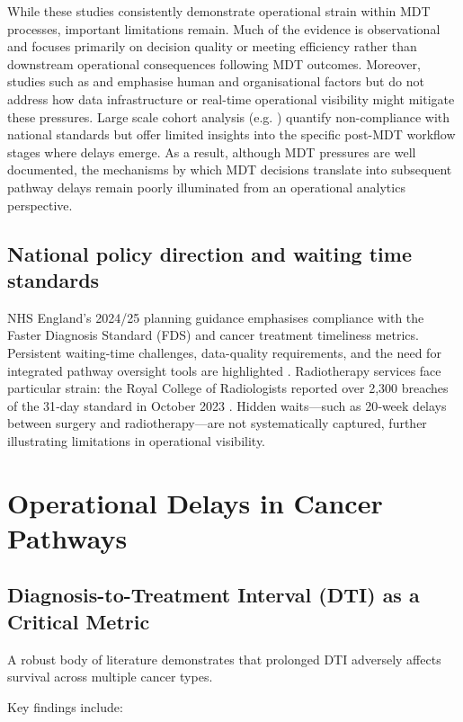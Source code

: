 While these studies consistently demonstrate operational strain within MDT processes, important limitations remain. Much of the evidence is observational and focuses primarily on decision quality or meeting efficiency rather than downstream operational consequences following MDT outcomes. Moreover, studies such as \cite{soukup2022} and \cite{law2024} emphasise human and organisational factors but do not address how data infrastructure or real-time operational visibility might mitigate these pressures. Large scale cohort analysis (e.g. \cite{lim2025}) quantify non-compliance with national standards but offer limited insights into the specific post-MDT workflow stages where delays emerge. As a result, although MDT pressures are well documented, the mechanisms by which MDT decisions translate into subsequent pathway delays remain poorly illuminated from an operational analytics perspective.  

\subsection{National policy direction and waiting time standards}

NHS England's 2024/25 planning guidance emphasises compliance with the Faster Diagnosis Standard (FDS) and cancer treatment timeliness metrics. Persistent waiting-time challenges, data-quality requirements, and the need for integrated pathway oversight tools are highlighted \citep{parker2026}. Radiotherapy services face particular strain: the Royal College of Radiologists reported over 2,300 breaches of the 31‑day standard in October 2023 \citep{rcr2024}. Hidden waits—such as 20‑week delays between surgery and radiotherapy—are not systematically captured, further illustrating limitations in operational visibility.

\section{Operational Delays in Cancer Pathways}

\subsection{Diagnosis-to-Treatment Interval (DTI) as a Critical Metric}

A robust body of literature demonstrates that prolonged DTI adversely affects survival across multiple cancer types.

Key findings include:


